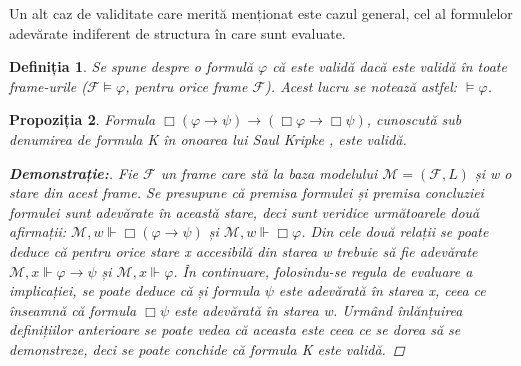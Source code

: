 \documentclass[12pt, openany]{book}
\newtheorem{definition}{Definiția}[chapter] %
\newtheorem{sentence}[definition]{Propoziția} %
\begin{document}
            \par{}
                Un alt caz de validitate care merită menționat este cazul general, cel al formulelor adevărate indiferent de
                structura în care sunt evaluate.

            \begin{definition}
                Se spune despre o formulă $\varphi$ că este validă dacă este validă în toate \textit{frame}-urile 
                ($\mathcal{F} \vDash \varphi$, pentru orice \textit{frame} $\mathcal{F}$). Acest lucru se notează astfel: 
                $\vDash \varphi$.
            \end{definition}

            \begin{sentence}
            \label{prop_axiom_K}
                Formula $\Box (\varphi \rightarrow \psi) \rightarrow (\Box \varphi \rightarrow \Box \psi)$, cunoscută 
                sub denumirea de formula K în onoarea lui Saul Kripke \cite{lecture_notes_hedin}, este validă.   
                
                \begin{proof}[\textbf{Demonstrație:}]
                    Fie $\mathcal{F}$ un \textit{frame} care stă la baza modelului $\mathcal{M}=(\mathcal{F},L)$ și w o stare 
                    din acest \textit{frame}. Se presupune că premisa formulei și premisa concluziei formulei sunt adevărate în 
                    această stare, deci sunt veridice următoarele două afirmații: $\mathcal{M},w \Vdash \Box (\varphi \rightarrow
                    \psi)$ și $\mathcal{M},w \Vdash \Box \varphi$. Din cele două relații se poate deduce că pentru orice stare x
                    accesibilă din starea w trebuie să fie adevărate $\mathcal{M},x \Vdash \varphi \rightarrow \psi$ și 
                    $\mathcal{M},x \Vdash \varphi$. În continuare, folosindu-se regula de evaluare a implicației, se poate deduce
                    că și formula $\psi$ este adevărată în starea x, ceea ce înseamnă că formula $\Box \psi$ este adevărată în 
                    starea w. Urmând înlănțuirea definițiilor anterioare se poate vedea că aceasta este ceea ce se dorea să se 
                    demonstreze, deci se poate conchide că formula K este validă.
                \end{proof}
            \end{sentence}
\end{document}
